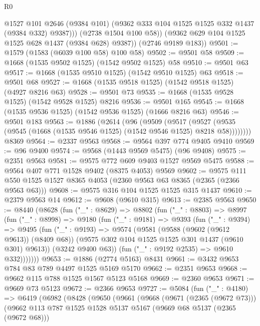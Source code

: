 \begin{lexlean}{R0}
\begin{coremodule}
              @1527
              @101
              @2646
              (@9384 @101)
              (@9362 @333 @104 @1525 @1525 @332 @1437 (@9384 @332) @9387)))
          (@2738 @1504 @100 @58))
        (@9362 @629 @104 @1525 @1525 @628 @1437 (@9384 @628) @9387))
      (@2746 @9189 @183))
@9501 := @1579 (@1583 (@6039 @100 @58) @100 @58)
@9502 := @9501 @58
@9509 := @1668 (@1535 @9502 @1525) (@1542 @9502 @1525) @58
@9510 := @9501 @63
@9517 := @1668 (@1535 @9510 @1525) (@1542 @9510 @1525) @63
@9518 := @9501 @68
@9527 := @1668 (@1535 @9518 @1525) (@1542 @9518 @1525) (@4927 @8216 @63)
@9528 := @9501 @73
@9535 := @1668 (@1535 @9528 @1525) (@1542 @9528 @1525) @8216
@9536 := @9501 @165
@9545 := @1668 (@1535 @9536 @1525) (@1542 @9536 @1525) (@1666 @8216 @63)
@9546 := @9501 @183
@9563 := @1886
    (@2614
      (@96
        (@9509
          (@9517
            (@9527 (@9535 (@9545 (@1668 (@1535 @9546 @1525) (@1542 @9546 @1525) @8218 @58))))))))
    @8369
@9564 := @2337 @9563
@9568 := @9564 @397 @774 @9405 @9410
@9569 := @96 @9400
@9574 := @9568 (@1443 @9569 @5475) (@96 @9408)
@9575 := @2351 @9563
@9581 := @9575 @772 @609 @9403 @1527 @9569 @5475
@9588 := @9564 @407 @771 @1528 @9402 (@8375 @4053) @9569
@9602 := @9575 @111 @550 @1525 @1527 @8365 @4053 (@2360 @9563 @63 @8365 (@2365 (@2366 @9563 @63)))
@9608 := @9575 @316 @104 @1525 @1525 @315 @1437
@9610 := @2379 @9563 @14
@9612 := @9608 (@9610 @315)
@9613 := @2385 @9563
@9650 := @8440
    (@8628
      (fun ("_" : @8629) =>
      @8802
        (fun ("_" : @8803) =>
        @8997
          (fun ("_" : @8998) =>
          @9180
            (fun ("_" : @9181) =>
            @9393
              (fun ("_" : @9394) =>
              @9495
                (fun ("_" : @9193) =>
                @9574
                  (@9581
                    (@9588 (@9602 (@9612 @9613)) (@8409 @68))
                    (@9575 @302 @104 @1525 @1525 @301 @1437 (@9610 @301) @9613))
                  (@3242 @9400 @63))
                (fun ("_" : @9192 @2535) => @9610 @332)))))))
@9653 := @1886 (@2774 @5163) @8431
@9661 := @3432 @9653 @784 @83 @789 @4497 @1525 @5169 @5170
@9662 := @2351 @9653
@9668 := @9662 @115 @788 @1525 @1567 @5123 @5168
@9669 := @2360 @9653
@9671 := @9669 @73 @5123
@9672 := @2366 @9653
@9727 := @5084
    (fun ("_" : @4180) =>
    @6419
      (@6982
        (@8428
          (@9650
            (@9661
              (@9668
                (@9671 (@2365 (@9672 @73)))
                (@9662
                  @113
                  @787
                  @1525
                  @1528
                  @5137
                  @5167
                  (@9669 @68 @5137 (@2365 (@9672 @68)))

\end{coremodule}
\end{lexlean}
